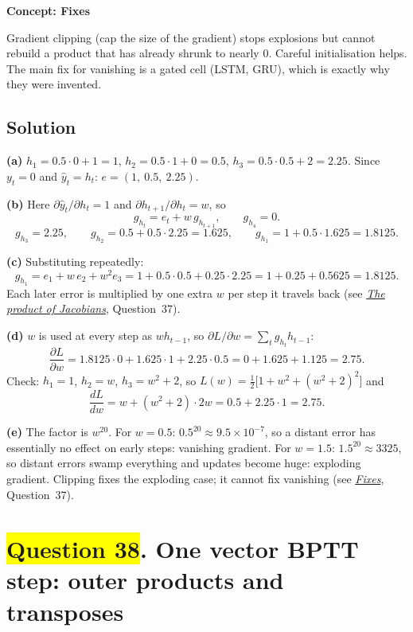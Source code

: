 \documentclass[12pt,a4paper]{article}
\newcommand{\concept}[2]{\par\medskip\phantomsection\label{#1}{\large\bfseries\color{blue!50!black} Concept: #2}\par}
\newcommand{\seeconcept}[3]{(see \hyperref[#1]{\textit{#2}}, Question~#3)}
\newcommand{\hlq}[1]{{\setlength{\fboxsep}{1.5pt}\colorbox{yellow}{#1}}}
\begin{document}
\concept{c:fixes}{Fixes}
Gradient clipping (cap the size of the gradient) stops explosions but cannot rebuild a product that has already shrunk to nearly 0. Careful initialisation helps. The main fix for vanishing is a gated cell (LSTM, GRU), which is exactly why they were invented.

\subsection*{Solution}
\textbf{(a)} $h_1=0.5\cdot0+1=1$, $h_2=0.5\cdot1+0=0.5$, $h_3=0.5\cdot0.5+2=2.25$. Since $y_t=0$ and $\hat y_t=h_t$: $e=(1,\ 0.5,\ 2.25)$.

\textbf{(b)} Here $\partial\hat y_t/\partial h_t=1$ and $\partial h_{t+1}/\partial h_t=w$, so
\[
g_{h_t}=e_t+w\,g_{h_{t+1}},\qquad g_{h_4}=0 .
\]
\[
g_{h_3}=2.25,\qquad g_{h_2}=0.5+0.5\cdot2.25=1.625,\qquad g_{h_1}=1+0.5\cdot1.625=1.8125 .
\]

\textbf{(c)} Substituting repeatedly:
\[
g_{h_1}=e_1+w\,e_2+w^2e_3=1+0.5\cdot0.5+0.25\cdot2.25=1+0.25+0.5625=1.8125 .
\]
Each later error is multiplied by one extra $w$ per step it travels back \seeconcept{c:jacprod}{The product of Jacobians}{37}.

\textbf{(d)} $w$ is used at every step as $wh_{t-1}$, so $\partial L/\partial w=\sum_tg_{h_t}h_{t-1}$:
\[
\frac{\partial L}{\partial w}=1.8125\cdot0+1.625\cdot1+2.25\cdot0.5=0+1.625+1.125=2.75 .
\]
Check: $h_1=1$, $h_2=w$, $h_3=w^2+2$, so $L(w)=\tfrac12\bigl[1+w^2+(w^2+2)^2\bigr]$ and
\[
\frac{dL}{dw}=w+(w^2+2)\cdot2w=0.5+2.25\cdot1=2.75 .
\]

\textbf{(e)} The factor is $w^{20}$. For $w=0.5$: $0.5^{20}\approx9.5\times10^{-7}$, so a distant error has essentially no effect on early steps: vanishing gradient. For $w=1.5$: $1.5^{20}\approx3325$, so distant errors swamp everything and updates become huge: exploding gradient. Clipping fixes the exploding case; it cannot fix vanishing \seeconcept{c:fixes}{Fixes}{37}.

\section[Question 38. One vector BPTT step: outer products and transposes]{\hlq{Question 38}. One vector BPTT step: outer products and transposes}
\end{document}
